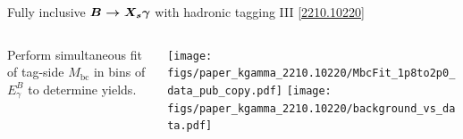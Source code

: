 \begin{frame}{Fully inclusive $\boldsymbol{B\rightarrow X_s\gamma}$ with hadronic tagging III \hfill \href{https://arxiv.org/abs/2210.10220}{[2210.10220]}}
\begin{columns}
\begin{column}{0.6\linewidth}
\bi
\item {\footnotesize Perform simultaneous fit of tag-side $M_{\mathrm{bc}}$ in bins of $E_\gamma^B$ to determine \BB yields.}
\bi
{}
\ei
{}
\bi
{}
\ei
{}
\ei
\end{column}
\begin{column}{0.4\linewidth}
\texttt{[image: figs/paper\_kgamma\_2210.10220/MbcFit\_1p8to2p0\_data\_pub\_copy.pdf]}
\texttt{[image: figs/paper\_kgamma\_2210.10220/background\_vs\_data.pdf]}
\end{column}
\end{columns}
\end{frame}
